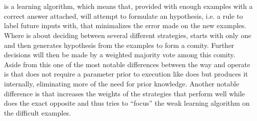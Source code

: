\section{\adaB}
\adaB is a learning algorithm, which means that, provided with enough examples with a correct answer attached, \adaB will attempt to formulate an hypothesis, i.e. a rule to label future inputs with, that minimalizes the error made on the new examples. Where \hedge is about deciding between several different strategies, \adaB starts with only one and then generates hypothesis from the examples to form a comity. Further decisions will then be made by a weighted majority vote among this comity. Aside from this one of the most notable differences between the way \hedge and \adaB operate is that \adaB does not require a parameter prior to execution like \hedge does but produces it internally, eliminating more of the need for prior knowledge. Another notable difference is that \hedge increases the weights of the strategies that perform well while \adaB does the exact opposite and thus tries to ``focus'' the weak learning algorithm on the difficult examples. 
